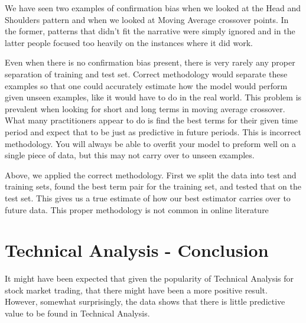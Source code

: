 \documentclass{report}
\begin{document}
We have seen two examples of confirmation bias when we looked at the Head and Shoulders pattern and when we looked at Moving Average crossover points. In the former, patterns that didn't fit the narrative were simply ignored and in the latter people focused too heavily on the instances where it did work.

Even when there is no confirmation bias present, there is very rarely any proper separation of training and test set. Correct methodology would separate these examples so that one could accurately estimate how the model would perform given unseen examples, like it would have to do in the real world. This problem is prevalent when looking for short and long terms in moving average crossover. What many practitioners appear to do is find the best terms for their given time period and expect that to be just as predictive in future periods. This is incorrect methodology. You will always be able to overfit your model to preform well on a single piece of data, but this may not carry over to unseen examples.

Above, we applied the correct methodology. First we split the data into test and training sets, found the best term pair for the training set, and tested that on the test set. This gives us a true estimate of how our best estimator carries over to future data. This proper methodology is not common in online literature


\section{Technical Analysis - Conclusion}

It might have been expected that given the popularity of Technical Analysis for stock market trading, that there might have been a more positive result. However, somewhat surprisingly, the data shows that there is little predictive value to be found in Technical Analysis. 



\end{document}
